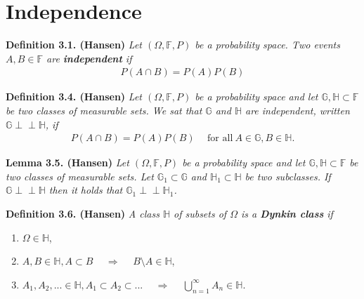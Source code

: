 \documentclass[
]{book}
\providecommand{\tightlist}{%
  \setlength{\itemsep}{0pt}\setlength{\parskip}{0pt}}
\begin{document}
\newpage

\hypertarget{independence}{%
\section{Independence}\label{independence}}

\textbf{Definition 3.1. (Hansen)} \emph{Let \((\Omega,\mathbb{F},P)\) be a probability space. Two events \(A,B\in\mathbb{F}\) are \textbf{independent} if}
\begin{align*}
    P(A\cap B)=P(A)P(B)\tag{3.1}
\end{align*}

\textbf{Definition 3.4. (Hansen)} \emph{Let \((\Omega,\mathbb{F},P)\) be a probability space and let \(\mathbb{G},\mathbb{H}\subset \mathbb{F}\) be two classes of measurable sets. We sat that \(\mathbb{G}\) and \(\mathbb{H}\) are independent, written \(\mathbb{G}\perp \!\!\! \perp\mathbb{H}\), if}
\begin{align*}
    P(A\cap B)=P(A)P(B)\hspace{15pt}\text{for all}\ A\in\mathbb{G},B\in\mathbb{H}.\tag{3.2}
\end{align*}

\textbf{Lemma 3.5. (Hansen)} \emph{Let \((\Omega,\mathbb{F},P)\) be a probability space and let \(\mathbb{G},\mathbb{H}\subset \mathbb{F}\) be two classes of measurable sets. Let \(\mathbb{G}_1\subset \mathbb{G}\) and \(\mathbb{H}_1\subset\mathbb{H}\) be two subclasses. If \(\mathbb{G}\perp \!\!\! \perp \mathbb{H}\) then it holds that \(\mathbb{G}_1\perp \!\!\! \perp \mathbb{H}_1\).}

\textbf{Definition 3.6. (Hansen)} \emph{A class \(\mathbb{H}\) of subsets of \(\Omega\) is a \textbf{Dynkin class} if}

\begin{enumerate}
\def\labelenumi{\arabic{enumi}.}
\tightlist
\item
  \(\Omega \in\mathbb{H}\),
\item
  \(A,B\in\mathbb{H},A\subset B\hspace{15pt}\Rightarrow\hspace{15pt}B\setminus A\in\mathbb{H}\),
\item
  \(A_1,A_2,...\in\mathbb{H},A_1\subset A_2\subset ...\hspace{15pt}\Rightarrow\hspace{15pt}\bigcup_{n=1}^\infty A_n\in\mathbb{H}\).
\end{enumerate}
\end{document}
